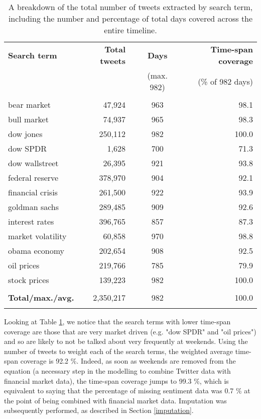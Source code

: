 \documentclass{article}
\begin{document}
\begin{table}[htb]
\centering
\begin{tabular}{lrlclr}
\textbf{Search term} & \textbf{Total tweets} &  & \textbf{Days} &  & \textbf{Time-span coverage}\\
 &  &  & (max. 982) &  & (\% of 982 days)\\
\hline
 &  &  &  &  & \\
bear market & 47,924 &  & 963 &  & 98.1\\
bull market & 74,937 &  & 965 &  & 98.3\\
dow jones & 250,112 &  & 982 &  & 100.0\\
dow SPDR & 1,628 &  & 700 &  & 71.3\\
dow wallstreet & 26,395 &  & 921 &  & 93.8\\
federal reserve & 378,970 &  & 904 &  & 92.1\\
financial crisis & 261,500 &  & 922 &  & 93.9\\
goldman sachs & 289,485 &  & 909 &  & 92.6\\
interest rates & 396,765 &  & 857 &  & 87.3\\
market volatility & 60,858 &  & 970 &  & 98.8\\
obama economy & 202,654 &  & 908 &  & 92.5\\
oil prices & 219,766 &  & 785 &  & 79.9\\
stock prices & 139,223 &  & 982 &  & 100.0\\
 &  &  &  &  & \\
\textbf{Total/max./avg.} & 2,350,217 &  & 982 &  & 100.0\\
 &  &  &  &  & \\
\end{tabular}\caption[A breakdown of all tweets obtained, by search term]{\label{tab.tweet-breakdown}A breakdown of the total number of tweets extracted by search term, including the number and percentage of total days covered across the entire timeline.}

\end{table}

Looking at Table \ref{tab.tweet-breakdown}, we notice that the search terms with lower time-span coverage are those that are very market driven (e.g. "dow SPDR" and "oil prices") and so are likely to not be talked about very frequently at weekends. Using the number of tweets to weight each of the search terms, the weighted average time-span coverage is 92.2 \%. Indeed, as soon as weekends are removed from the equation (a necessary step in the modelling to combine Twitter data with financial market data), the time-span coverage jumps to 99.3 \%, which is equivalent to saying that the percentage of missing sentiment data was 0.7 \% at the point of being combined with financial market data. Imputation was subsequently performed, as described in Section \ref{imputation}.
\end{document}
